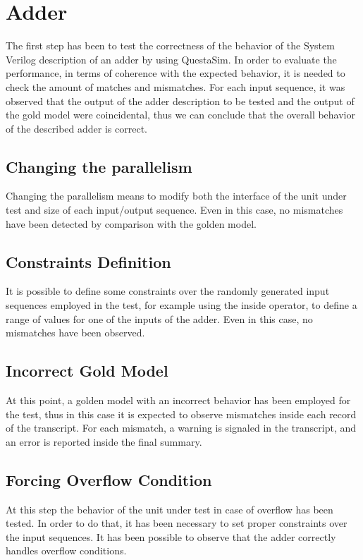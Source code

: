 %
 
\chapter{Adder}
\label{cha2}

The first step has been to test the correctness of the behavior of the System Verilog description of
an adder by using QuestaSim.
In order to evaluate the performance, in terms of coherence with the expected behavior, it is needed
to check the amount of matches and mismatches.
For each input sequence, it was observed that the output of the adder description to be tested
and the output of the gold model were coincidental, thus we can conclude that the overall 
behavior of the described adder is correct.

\section{Changing the parallelism}
Changing the parallelism means to modify both the interface of the unit under test and
size of each input/output sequence.
Even in this case, no mismatches have been detected by comparison with the golden model.

\section{Constraints Definition}
It is possible to define some constraints over the randomly generated input sequences 
employed in the test, for example using the inside operator, to define a range of values
for one of the inputs of the adder.
Even in this case, no mismatches have been observed.

\section{Incorrect Gold Model}
At this point, a golden model with an incorrect behavior has been employed for the test, thus
in this case it is expected to observe mismatches inside each record of the transcript.
For each mismatch, a warning is signaled in the transcript, and an error is reported inside
the final summary.

\section{Forcing Overflow Condition}
At this step the behavior of the unit under test in case of overflow has been tested.
In order to do that, it has been necessary to set proper constraints over the input sequences.
It has been possible to observe that the adder correctly handles overflow conditions.